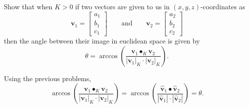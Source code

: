\documentclass[newpage,hints,handout,12pt,noauthor,nooutcomes]{ximera}
\begin{document}
\begin{problem}
  Show that when $K>0$ if two vectors are given to us in $(x,y,z)$-coordinates as
  \[
  \mathbf{v}_{1}=\begin{bmatrix}a_{1} \\ b_{1} \\ c_{1}\end{bmatrix}
  \qquad\text{and}\qquad
  \mathbf{v}_{2} =\begin{bmatrix}a_{2} \\ b_{2} \\ c_{2}\end{bmatrix}
  \]
  then the angle between their image in euclidean space is given by
  \[
  \theta = \arccos\left(\frac{\mathbf{v}_1\bullet_K \mathbf{v}_2}{|\mathbf{v}_1|_K \cdot|\mathbf{v}_2|_K }\right).
  \]


\begin{freeResponse} Using the previous problems,
\[
\arccos\left(\frac{\mathbf{v}_1\bullet_K \mathbf{v}_2}{\left| \mathbf{v}_1\right|_K \cdot\left|\mathbf{v}_2\right|_K }\right) = \arccos\left(\frac{\hat{\mathbf v}_{1}\bullet \hat{\mathbf v}_{2}}{\left| \hat{\mathbf v}_{1}\right| \cdot\left|\hat{\mathbf v}_{2}\right| }\right) = \theta.
\]
\end{freeResponse}
\end{problem}
\end{document}
